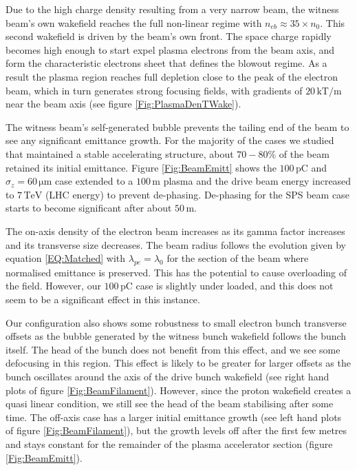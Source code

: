\documentclass[aps,prstab,reprint,amsmath,amssymb,groupedaddress]{revtex4-1}
\newcommand{\unit}[1]{\,\mathrm{#1}}
\begin{document}
Due to the high charge density resulting from a very narrow beam, the witness beam's own wakefield reaches the full
non-linear regime with $n_{eb} \approx 35\times n_{0}$. This second wakefield is driven by the beam's own front. The
space charge rapidly becomes high enough to start expel plasma electrons from the beam axis, and form the characteristic
electrons sheet that defines the blowout regime. As a result the plasma region reaches full depletion close to the peak
of the electron beam, which in turn generates strong focusing fields, with gradients of $20\unit{kT/m}$ near the beam
axis (see figure \ref{Fig:PlasmaDenTWake}).


The witness beam's self-generated bubble prevents the tailing end of the beam to see any significant emittance growth.
For the majority of the cases we studied that maintained a stable accelerating structure, about $70-80\%$ of the beam
retained its initial emittance. Figure \ref{Fig:BeamEmitt} shows the $100\unit{pC}$ and $\sigma_{z} = 60\unit{\mu m}$
case extended to a $100\unit{m}$ plasma and the drive beam energy increased to $7\unit{TeV}$ (LHC energy) to prevent
de-phasing. De-phasing for the SPS beam case starts to become significant after about $50\unit{m}$.

The on-axis density of the electron beam increases as its gamma factor increases and its transverse size decreases. The
beam radius follows the evolution given by equation \ref{EQ:Matched} with $\lambda_{pe} = \lambda_{0}$ for the section
of the beam where normalised emittance is preserved. This has the potential to cause overloading of the field. However,
our $100\unit{pC}$ case is slightly under loaded, and this does not seem to be a significant effect in this instance.


Our configuration also shows some robustness to small electron bunch transverse offsets as the bubble generated by the
witness bunch wakefield follows the bunch itself. The head of the bunch does not benefit from this effect, and we see
some defocusing in this region. This effect is likely to be greater for larger offsets as the bunch oscillates around
the axis of the drive bunch wakefield (see right hand plots of figure \ref{Fig:BeamFilament}). However, since the proton
wakefield creates a quasi linear condition, we still see the head of the beam stabilising after some time. The off-axis
case has a larger initial emittance growth (see left hand plots of figure \ref{Fig:BeamFilament}), but the growth levels
off after the first few metres and stays constant for the remainder of the plasma accelerator section (figure
\ref{Fig:BeamEmitt}).
\end{document}
